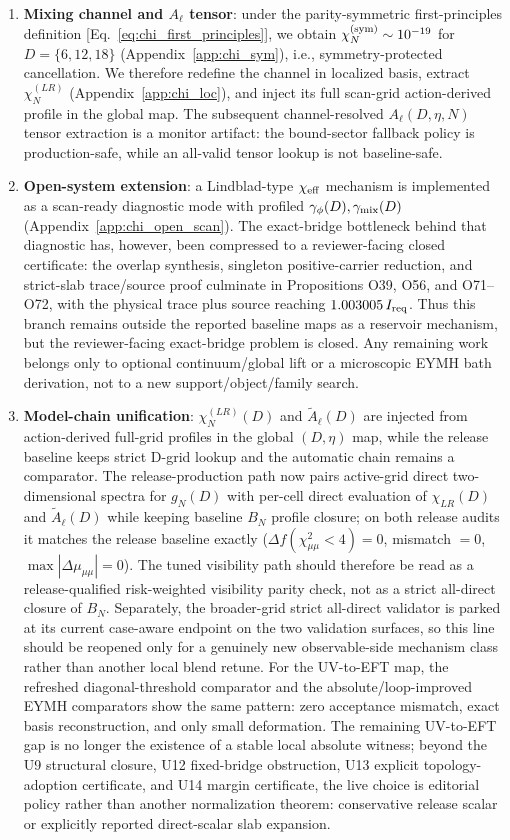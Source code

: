 \documentclass[aps,prd,onecolumn,notitlepage,nofootinbib,superscriptaddress,11pt,floatfix]{revtex4-2}
\begin{document}
\begin{enumerate}
    \item \textbf{Mixing channel and \(A_\ell\) tensor}: under the parity-symmetric first-principles definition [Eq.~\eqref{eq:chi_first_principles}], we obtain $\chi_N^{\rm(sym)}\sim 10^{-19}$ for $D=\{6,12,18\}$ (Appendix~\ref{app:chi_sym}), i.e., symmetry-protected cancellation. We therefore redefine the channel in localized basis, extract $\chi_N^{(LR)}$ (Appendix~\ref{app:chi_loc}), and inject its full scan-grid action-derived profile in the global map. The subsequent channel-resolved \(A_\ell(D,\eta,N)\) tensor extraction is a monitor artifact: the bound-sector fallback policy is production-safe, while an all-valid tensor lookup is not baseline-safe.
    \item \textbf{Open-system extension}: a Lindblad-type $\chi_{\rm eff}$ mechanism is implemented as a scan-ready diagnostic mode with profiled $\gamma_\phi(D),\gamma_{\rm mix}(D)$ (Appendix~\ref{app:chi_open_scan}). The exact-bridge bottleneck behind that diagnostic has, however, been compressed to a reviewer-facing closed certificate: the overlap synthesis, singleton positive-carrier reduction, and strict-slab trace/source proof culminate in Propositions O39, O56, and O71--O72, with the physical trace plus source reaching \(1.003005\,I_{\rm req}\). Thus this branch remains outside the reported baseline maps as a reservoir mechanism, but the reviewer-facing exact-bridge problem is closed. Any remaining work belongs only to optional continuum/global lift or a microscopic EYMH bath derivation, not to a new support/object/family search.
    \item \textbf{Model-chain unification}: $\chi_N^{(LR)}(D)$ and $\tilde A_\ell(D)$ are injected from action-derived full-grid profiles in the global $(D,\eta)$ map, while the release baseline keeps strict D-grid lookup and the automatic chain remains a comparator. The release-production path now pairs active-grid direct two-dimensional spectra for $g_N(D)$ with per-cell direct evaluation of $\chi_{LR}(D)$ and $\tilde A_\ell(D)$ while keeping baseline $B_N$ profile closure; on both release audits it matches the release baseline exactly ($\Delta f(\chi^2_{\mu\mu}<4)=0$, mismatch $=0$, $\max|\Delta\mu_{\mu\mu}|=0$). The tuned visibility path should therefore be read as a release-qualified risk-weighted visibility parity check, not as a strict all-direct closure of $B_N$. Separately, the broader-grid strict all-direct validator is parked at its current case-aware endpoint on the two validation surfaces, so this line should be reopened only for a genuinely new observable-side mechanism class rather than another local blend retune. For the UV-to-EFT map, the refreshed diagonal-threshold comparator and the absolute/loop-improved EYMH comparators show the same pattern: zero acceptance mismatch, exact basis reconstruction, and only small deformation. The remaining UV-to-EFT gap is no longer the existence of a stable local absolute witness; beyond the U9 structural closure, U12 fixed-bridge obstruction, U13 explicit topology-adoption certificate, and U14 margin certificate, the live choice is editorial policy rather than another normalization theorem: conservative release scalar or explicitly reported direct-scalar slab expansion.

\end{enumerate}
\end{document}
